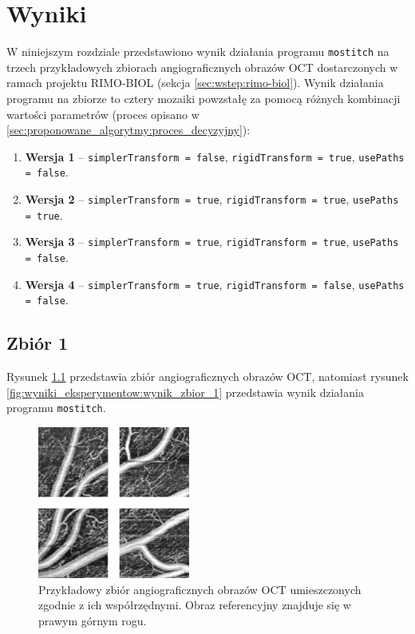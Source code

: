 %
\chapter{Wyniki}
\label{sec:wyniki_eksperymentow}

W niniejszym rozdziale przedstawiono wynik działania programu \texttt{mostitch} na trzech przykładowych zbiorach angiograficznych obrazów OCT dostarczonych w ramach projektu RIMO-BIOL (sekcja \ref{sec:wstep:rimo-biol}). Wynik działania programu na zbiorze to cztery mozaiki powzstałę za pomocą różnych kombinacji wartości parametrów (proces opisano w \ref{sec:proponowane_algorytmy:proces_decyzyjny}):

\begin{enumerate}
\item \textbf{Wersja 1} -- \texttt{simplerTransform = false}, \texttt{rigidTransform = true}, \texttt{usePaths = false}. 
\item \textbf{Wersja 2} -- \texttt{simplerTransform = true}, \texttt{rigidTransform = true}, \texttt{usePaths = true}.
\item \textbf{Wersja 3} -- \texttt{simplerTransform = true}, \texttt{rigidTransform = true}, \texttt{usePaths = false}.
\item \textbf{Wersja 4} -- \texttt{simplerTransform = true}, \texttt{rigidTransform = false}, \texttt{usePaths = false}.
\end{enumerate}

\section{Zbiór 1}
\label{sec:zbior_1}

Rysunek \ref{fig:wyniki_eksperymentow:zbior_1} przedstawia zbiór angiograficznych obrazów OCT, natomiast rysunek \ref{fig:wyniki_eksperymentow:wynik_zbior_1} przedstawia wynik działania programu \texttt{mostitch}.

\begin{figure}[H]
  \centering
  \includegraphics[width=5cm]{gfx/zbior_1}
  \caption{Przykładowy zbiór angiograficznych obrazów OCT umieszczonych zgodnie z ich współrzędnymi. Obraz referencyjny znajduje się w prawym górnym rogu.}
  \label{fig:wyniki_eksperymentow:zbior_1}
\end{figure}

